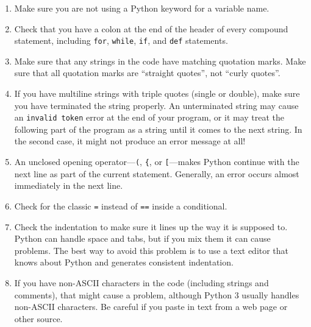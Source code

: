 \begin{enumerate}

\item Make sure you are not using a Python keyword for a variable name.

\item Check that you have a colon at the end of the header of every
compound statement, including {\tt for}, {\tt while},
{\tt if}, and {\tt def} statements.

\item Make sure that any strings in the code have matching
quotation marks.  Make sure that all quotation marks are
``straight quotes'', not ``curly quotes''.

\item If you have multiline strings with triple quotes (single or double), make
sure you have terminated the string properly.  An unterminated string
may cause an {\tt invalid token} error at the end of your program,
or it may treat the following part of the program as a string until it
comes to the next string.  In the second case, it might not produce an error
message at all!

\item An unclosed opening operator---\verb+(+, \verb+{+, or
  \verb+[+---makes Python continue with the next line as part of the
  current statement.  Generally, an error occurs almost immediately in
  the next line.

\item Check for the classic {\tt =} instead of {\tt ==} inside
a conditional.

\item Check the indentation to make sure it lines up the way it
is supposed to.  Python can handle space and tabs, but if you mix
them it can cause problems.  The best way to avoid this problem
is to use a text editor that knows about Python and generates
consistent indentation.

\item If you have non-ASCII characters in the code (including strings
and comments), that might cause a problem, although Python 3 usually
handles non-ASCII characters.  Be careful if you paste in text from
a web page or other source.

\end{enumerate}

